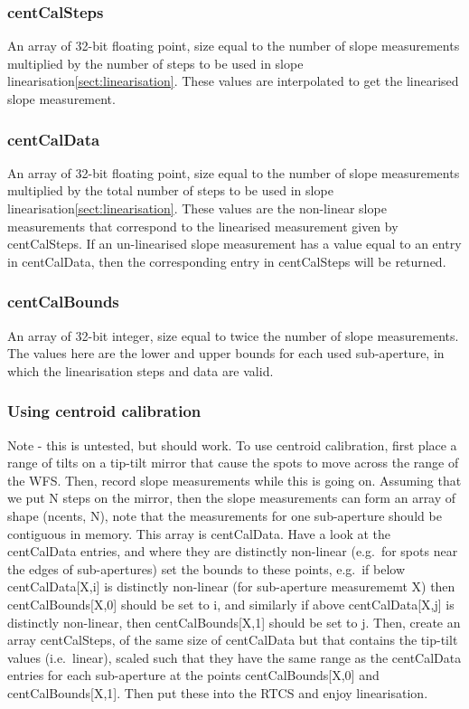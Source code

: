 \documentclass[a4,10pt]{article}
\begin{document}
\subsubsection{centCalSteps}
An array of 32-bit floating point, size equal to the number of slope
measurements multiplied by the number of steps to be used in slope
linearisation\ref{sect:linearisation}.  These values are interpolated
to get the linearised slope measurement.

\subsubsection{centCalData}
An array of 32-bit floating point, size equal to the number of slope
measurements multiplied by the total number of steps to be used in
slope linearisation\ref{sect:linearisation}.  These values are the
non-linear slope measurements that correspond to the linearised
measurement given by centCalSteps.  If an un-linearised slope
measurement has a value equal to an entry in centCalData, then the
corresponding entry in centCalSteps will be returned.

\subsubsection{centCalBounds}
An array of 32-bit integer, size equal to twice the number of slope
measurements.  The values here are the lower and upper bounds for each
used sub-aperture, in which the linearisation steps and data are valid.

\subsubsection{Using centroid calibration}
Note - this is untested, but should work.  To use centroid
calibration, first place a range of tilts on a tip-tilt mirror that
cause the spots to move across the range of the WFS.  Then, record
slope measurements while this is going on.  Assuming that we put N
steps on the mirror, then the slope measurements can form an array of
shape (ncents, N), note that the measurements for one sub-aperture
should be contiguous in memory.  This array is centCalData.  Have a
look at the centCalData entries, and where they are distinctly
non-linear (e.g.\ for spots near the edges of sub-apertures) set the
bounds to these points, e.g.\ if below centCalData[X,i] is distinctly
non-linear (for sub-aperture measurememt X) then centCalBounds[X,0]
should be set to i, and similarly if above centCalData[X,j] is
distinctly non-linear, then centCalBounds[X,1] should be set to j.
Then, create an array centCalSteps, of the same size of centCalData
but that contains the tip-tilt values (i.e.\ linear), scaled such that
they have the same range as the centCalData entries for each
sub-aperture at the points centCalBounds[X,0] and centCalBounds[X,1].
Then put these into the RTCS and enjoy linearisation.
\end{document}
